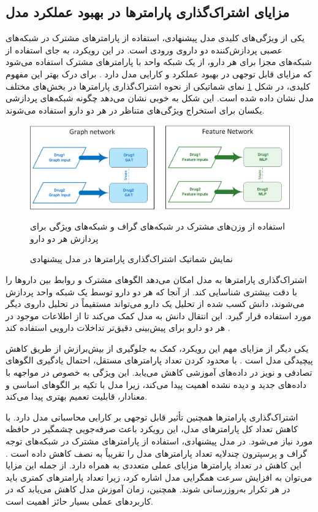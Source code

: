 \subsection{مزایای اشتراک‌گذاری پارامترها در بهبود عملکرد مدل}

یکی از ویژگی‌های کلیدی مدل پیشنهادی، استفاده از پارامترهای مشترک در شبکه‌های عصبی پردازش‌کننده دو داروی ورودی است. در این رویکرد، به جای استفاده از شبکه‌های مجزا برای هر دارو، از یک شبکه واحد با پارامترهای مشترک استفاده می‌شود که مزایای قابل توجهی در بهبود عملکرد و کارایی مدل دارد \cite{ref_dai2020}. برای درک بهتر این مفهوم کلیدی، در شکل \ref{fig:param_sharing} نمای شماتیکی از نحوه اشتراک‌گذاری پارامترها در بخش‌های مختلف مدل نشان داده شده است. این شکل به خوبی نشان می‌دهد چگونه شبکه‌های پردازشی یکسان برای استخراج ویژگی‌های متناظر در هر دو دارو استفاده می‌شوند.

\begin{figure}[t]
	\centering
	\includegraphics[width=\textwidth]{images/param-sharing.png}
	\caption{نمایش شماتیک اشتراک‌گذاری پارامترها در مدل پیشنهادی} استفاده از وزن‌های مشترک در شبکه‌های گراف و شبکه‌های ویژگی برای پردازش هر دو دارو
	\label{fig:param_sharing}
\end{figure}

اشتراک‌گذاری پارامترها به مدل امکان می‌دهد الگوهای مشترک و روابط بین داروها را با دقت بیشتری شناسایی کند. از آنجا که هر دو دارو توسط یک شبکه واحد پردازش می‌شوند، دانش کسب شده از تحلیل یک دارو می‌تواند مستقیماً در تحلیل داروی دیگر مورد استفاده قرار گیرد. این انتقال دانش به مدل کمک می‌کند تا از اطلاعات موجود در هر دو دارو برای پیش‌بینی دقیق‌تر تداخلات دارویی استفاده کند \cite{ref_deng2020}.

یکی دیگر از مزایای مهم این رویکرد، کمک به جلوگیری از بیش‌برازش از طریق کاهش پیچیدگی مدل است \cite{ref_xu2019}. با محدود کردن تعداد پارامترهای مستقل، احتمال یادگیری الگوهای تصادفی و نویز در داده‌های آموزشی کاهش می‌یابد. این ویژگی به خصوص در مواجهه با داده‌های جدید و دیده نشده اهمیت پیدا می‌کند، زیرا مدل با تکیه بر الگوهای اساسی و معنادار، قابلیت تعمیم بهتری پیدا می‌کند.

اشتراک‌گذاری پارامترها همچنین تأثیر قابل توجهی بر کارایی محاسباتی مدل دارد. با کاهش تعداد کل پارامترهای مدل، این رویکرد باعث صرفه‌جویی چشمگیر در حافظه مورد نیاز می‌شود. در مدل پیشنهادی، استفاده از پارامترهای مشترک در شبکه‌های توجه گراف و پرسپترون چندلایه تعداد پارامترهای مدل را تقریباً به نصف کاهش داده است \cite{ref_dai2020}. این کاهش در تعداد پارامترها مزایای عملی متعددی به همراه دارد. از جمله این مزایا می‌توان به افزایش سرعت همگرایی مدل اشاره کرد، زیرا تعداد پارامترهای کمتری باید در هر تکرار به‌روزرسانی شوند. همچنین، زمان آموزش مدل کاهش می‌یابد که در کاربردهای عملی بسیار حائز اهمیت است.

